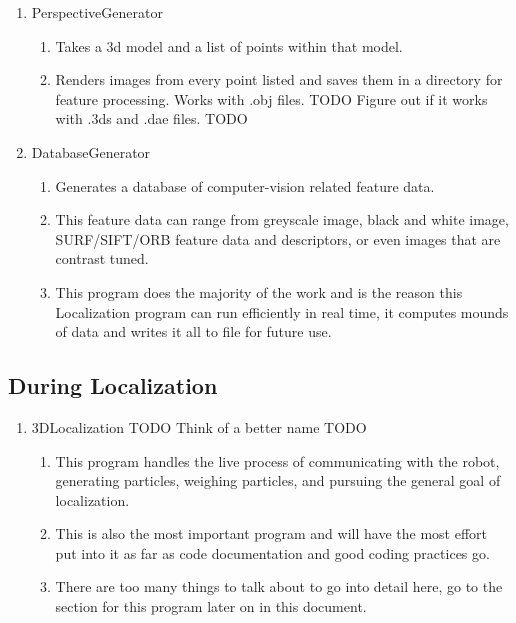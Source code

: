 \documentclass[a4paper,11pt]{article}
\begin{document}
        \begin{enumerate}
        \item PerspectiveGenerator
            \begin{enumerate}
            \item Takes a 3d model and a list of points within that model.
            \item Renders images from every point listed and saves them in a directory for feature processing. Works with .obj files. TODO Figure out if it works with .3ds and .dae files. TODO
            \end{enumerate}
        \item DatabaseGenerator
            \begin{enumerate}
            \item Generates a database of computer-vision related feature data.
            \item This feature data can range from greyscale image, black and white image, SURF/SIFT/ORB feature data and descriptors, or even images that are contrast tuned.
            \item This program does the majority of the work and is the reason this Localization program can run efficiently in real time, it computes mounds of data and writes it all to file for future use.
            \end{enumerate}
        \end{enumerate}
  
        \subsection{During Localization}
        \begin{enumerate}
        \item 3DLocalization TODO Think of a better name TODO
            \begin{enumerate}
            \item This program handles the live process of communicating with the robot, generating particles, weighing particles, and pursuing the general goal of localization.
            \item This is also the most important program and will have the most effort put into it as far as code documentation and good coding practices go.
            \item There are too many things to talk about to go into detail here, go to the section for this program later on in this document.
            \end{enumerate}
        \end{enumerate}
        \newpage
\end{document}
